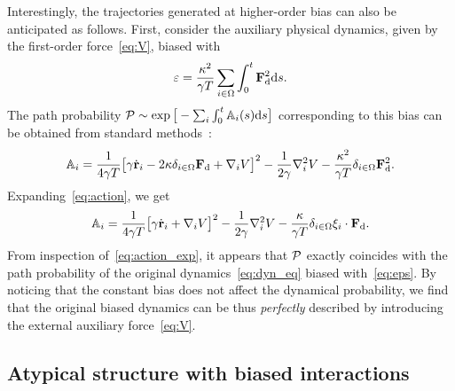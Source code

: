 \documentclass[superscriptaddress, twocolumn, prx, longbibliography, nofootinbib]{revtex4-1}
\newcommand{\tn}[1]{{\color{red}#1}}
\begin{document}
Interestingly, the trajectories generated at higher-order bias can also be anticipated as follows. First, consider the auxiliary physical dynamics, given by the first-order force~\eqref{eq:V}, biased with
\begin{equation}\label{eq:eps_prime}
	\varepsilon = \frac{\kappa^2}{\gamma T}\sum_{i\in\Omega}\int_0^t{\bf F}_{\rm d}^2{\rm d}s .
\end{equation}
The path probability ${\cal P}\sim\exp\big[-\sum_i\int_0^t{\mathbb A}_i(s){\rm d}s\big]$ corresponding to this bias can be obtained from standard methods~\cite{Martin1973, Dominicis1975}:
\begin{equation}\label{eq:action}
	{\mathbb A}_i = \frac{1}{4\gamma T} \big[\gamma\dot{\bf r}_i - 2\kappa\delta_{i\in\Omega}{\bf F}_{\rm d} + \nabla_iV\big]^2 - \frac{1}{2\gamma} \nabla^2_iV - \frac{\kappa^2}{\gamma T}\delta_{i\in\Omega}{\bf F}_{\rm d}^2 .
\end{equation}
Expanding~\eqref{eq:action}, %
we get
\tn{
\begin{equation}\label{eq:action_exp}
	{\mathbb A}_i = \frac{1}{4\gamma T} \big[\gamma\dot{\bf r}_i + \nabla_iV\big]^2 - \frac{1}{2\gamma} \nabla^2_iV - \frac{\kappa}{\gamma T} \delta_{i\in\Omega}\xi_i \cdot {\bf F}_{\rm d}.
\end{equation}}
From inspection of~\eqref{eq:action_exp}, it appears that $\cal P$ exactly coincides with the path probability of the original dynamics~\eqref{eq:dyn_eq} biased with~\eqref{eq:eps}. 
\tn{By noticing
that the constant bias does not affect the dynamical probability, we find that the original biased dynamics can be thus {\it perfectly} described by introducing the external auxiliary force~\eqref{eq:V}.}






\subsection{Atypical structure with biased interactions}
\end{document}
